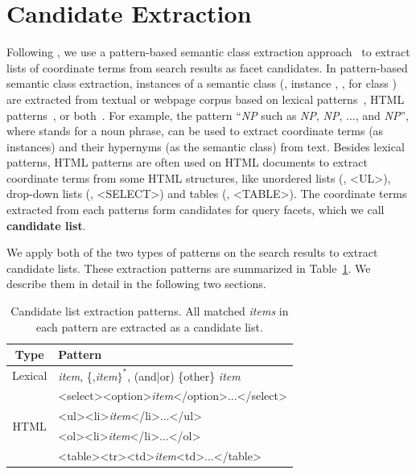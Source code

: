 \section{Candidate Extraction}
\label{sec:facet-candidate}
Following \citet{dou2011finding}, we use a pattern-based semantic class extraction approach~\cite{shi2010corpus} to extract lists of coordinate terms from search results as facet candidates. In pattern-based semantic class extraction, instances of a semantic class (\eg, instance , ,  for class ) are extracted from textual or webpage corpus based on lexical patterns~\cite{hearst1992automatic,pasca2004acquisition}, HTML patterns~\cite{shinzato2007simple}, or both~\cite{shi2008pattern,zhang2009employing}. For example, the pattern ``\textit{NP} such as \textit{NP}, \textit{NP}, ..., and \textit{NP}'', where  stands for a noun phrase, can be used to extract coordinate terms (as instances) and their hypernyms (as the semantic class) from text. Besides lexical patterns, HTML patterns are often used on HTML documents to extract coordinate terms from some HTML structures, like unordered lists (\ie, <UL>), drop-down lists (\ie, <SELECT>) and 
tables (\ie, <TABLE>). The coordinate terms extracted from each patterns form candidates for query facets, which we call \textbf{candidate list}.

We apply both of the two types of patterns on the search results to extract candidate lists. These extraction patterns are summarized in Table~\ref{tab:facet-patterns}. We describe them in detail in the following two sections.

\begin{table}[H]
\centering
\caption{Candidate list extraction patterns. All matched \textit{items} in each pattern are extracted as a candidate list.}
\label{tab:facet-patterns}
\begin{tabular}{|c|l|} \hline
Type& Pattern\\ \hline
Lexical & \textit{item}, \{,\textit{item}$\}^*$, (and|or) \{other\} \textit{item} \\  \hline
\multirow{4}{*}{HTML}
& <select><option>\textit{item}</option>...</select>\\\cline{2-2}
& <ul><li>\textit{item}</li>...</ul>\\\cline{2-2}
& <ol><li>\textit{item}</li>...</ol>\\\cline{2-2}
& <table><tr><td>\textit{item}<td>...</table>\\ \hline
\end{tabular}
\end{table}

